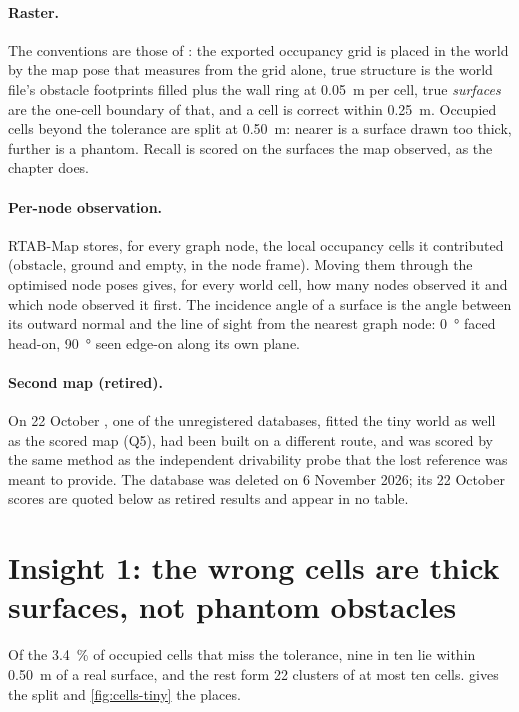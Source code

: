 \documentclass[11pt,a4paper,notitlepage]{report}
\begin{document}
\paragraph{Raster.} The conventions are those of :
the exported occupancy grid is placed in the world by the map pose that
 measures from the grid alone, true structure is
the world file's obstacle footprints filled plus the wall ring at \SI{0.05}{\metre}
per cell, true \emph{surfaces} are the one-cell boundary of that, and a cell is
correct within \SI{0.25}{\metre}. Occupied cells beyond the tolerance are split
at \SI{0.50}{\metre}: nearer is a surface drawn too thick, further is a phantom.
Recall is scored on the surfaces the map observed, as the chapter does.

\paragraph{Per-node observation.} RTAB-Map stores, for every graph node, the
local occupancy cells it contributed (obstacle, ground and empty, in the node
frame). Moving them through the optimised node poses gives, for every world
cell, how many nodes observed it and which node observed it first. The
incidence angle of a surface is the angle between its outward normal and the
line of sight from the nearest graph node: \SI{0}{\degree} faced head-on,
\SI{90}{\degree} seen edge-on along its own plane.

\paragraph{Second map (retired).} On 22 October , one
of the unregistered databases, fitted the tiny world as well as the scored map
(Q5), had been built on a different route, and was scored by the same method
as the independent drivability probe that the lost
 reference was meant to provide. The
database was deleted on 6 November 2026; its 22 October scores are quoted
below as retired results and appear in no table.

\FloatBarrier
\section{Insight 1: the wrong cells are thick surfaces, not phantom obstacles}

Of the \SI{3.4}{\percent} of occupied cells that miss the tolerance, nine in
ten lie within \SI{0.50}{\metre} of a real surface, and the rest form 22
clusters of at most ten cells.  gives the split and
\cref{fig:cells-tiny} the places.
\end{document}

